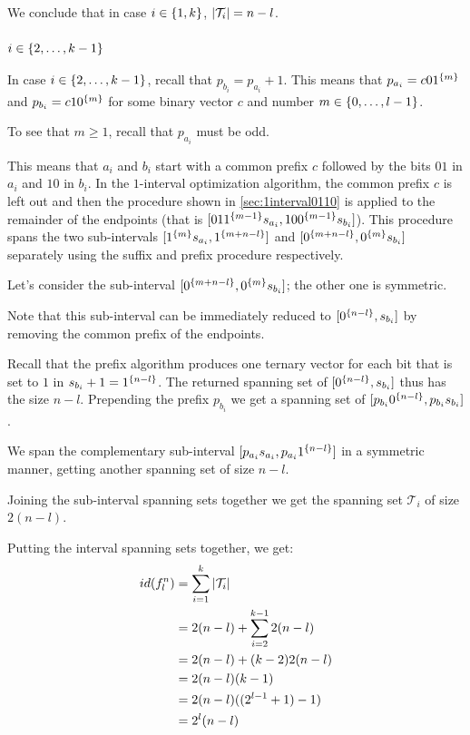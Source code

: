 We conclude that in case $i \in \{1, k\}$,
$\lvert\mathcal{T}_i\rvert = n-l$.

\subsubsection{$i \in \{2, \ldots, k-1\}$}

In case $i \in \{2, \ldots, k-1\}$,
recall that $p_{b_i} = p_{a_i} + 1$.
This means that $p_{a_i} = c 0 1^{\{m\}}$
and $p_{b_i} = c 1 0^{\{m\}}$
for some binary vector $c$
and number $m \in \{0, \ldots, l-1\}$.

To see that $m \geq 1$,
recall that $p_{a_i}$ must be odd.

This means that $a_i$ and $b_i$
start with a common prefix $c$
followed by the bits $01$ in $a_i$
and $10$ in $b_i$.
In the $1$-interval optimization algorithm,
the common prefix $c$ is left out
and then the procedure
shown in \autoref{sec:1interval0110}
is applied to the remainder of the endpoints
(that is
$[01 1^{\{m-1\}} s_{a_i}, 10 0^{\{m-1\}} s_{b_i}]$).
This procedure spans the two sub-intervals
$[1^{\{m\}} s_{a_i}, 1^{\{m+n-l\}}]$
and $[0^{\{m+n-l\}}, 0^{\{m\}} s_{b_i}]$
separately using the suffix and prefix procedure
respectively.

Let's consider the sub-interval
$[0^{\{m+n-l\}}, 0^{\{m\}} s_{b_i}]$;
the other one is symmetric.

Note that this sub-interval can be immediately reduced
to $[0^{\{n-l\}}, s_{b_i}]$
by removing the common prefix of the endpoints.

Recall that the prefix algorithm
produces one ternary vector
for each bit that is set to $1$
in $s_{b_i} + 1 = 1^{\{n-l\}}$.
The returned spanning set of
$[0^{\{n-l\}}, s_{b_i}]$
thus has the size $n-l$.
Prepending the prefix $p_{b_i}$
we get a spanning set of
$[p_{b_i} 0^{\{n-l\}}, p_{b_i} s_{b_i}]$.

We span the complementary sub-interval
$[p_{a_i} s_{a_i}, p_{a_i} 1^{\{n-l\}}]$
in a symmetric manner,
getting another spanning set of size $n-l$.

Joining the sub-interval spanning sets together
we get the spanning set $\mathcal{T}_i$ of size $2(n-l)$.

\hfill

Putting the interval spanning sets together,
we get:
\begin{align*}
id(f_l^n) &= \sum_{i=1}^k{\lvert\mathcal{T}_i\rvert} \\
&= 2 (n-l) + \sum_{i=2}^{k-1}{2 (n-l)} \\
&= 2 (n-l) + (k-2) 2 (n-l) \\
&= 2 (n-l) (k-1) \\
&= 2 (n-l) ((2^{l-1} + 1) - 1) \\
&= 2^l (n-l)
\end{align*}

